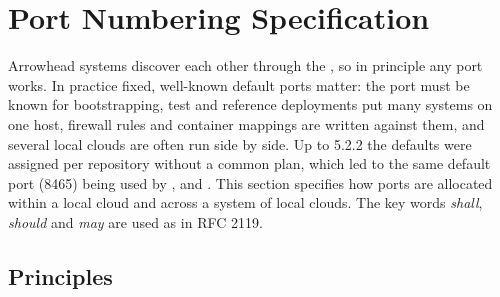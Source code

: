 \section{Port Numbering Specification}
\label{sec:ports}

Arrowhead systems discover each other through the , so in principle any
port works. In practice fixed, well-known default ports matter: the  port
must be known for bootstrapping, test and reference deployments put many systems on one host,
firewall rules and container mappings are written against them, and several local clouds are
often run side by side. Up to 5.2.2 the defaults were assigned per repository without a common
plan, which led to the same default port (8465) being used by
,  and . This
section specifies how ports are allocated within a local cloud and across a system of local
clouds. The key words \emph{shall}, \emph{should} and \emph{may} are used as in RFC 2119.

\subsection{Principles}

